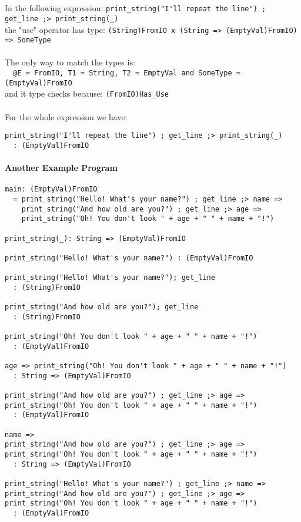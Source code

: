 \documentclass{article}
\begin{document}
\\\\
In the following expression:
\verb|print_string("I'll repeat the line") ; get_line ;> print_string(_)|
\\
the "use" operator has type:
\verb|(String)FromIO x (String => (EmptyVal)FromIO) => SomeType|
\\\\
The only way to match the types is:
\\
\verb|  @E = FromIO, T1 = String, T2 = EmptyVal and SomeType = (EmptyVal)FromIO|
\\
and it type checks because: \verb|(FromIO)Has_Use|
\\\\
For the whole expression we have:
\begin{verbatim}
print_string("I'll repeat the line") ; get_line ;> print_string(_)
  : (EmptyVal)FromIO
\end{verbatim}

\newpage
\paragraph{Another Example Program}
\begin{verbatim}
main: (EmptyVal)FromIO
  = print_string("Hello! What's your name?") ; get_line ;> name =>
    print_string("And how old are you?") ; get_line ;> age =>
    print_string("Oh! You don't look " + age + " " + name + "!")

print_string(_): String => (EmptyVal)FromIO

print_string("Hello! What's your name?") : (EmptyVal)FromIO

print_string("Hello! What's your name?"); get_line
  : (String)FromIO

print_string("And how old are you?"); get_line
  : (String)FromIO

print_string("Oh! You don't look " + age + " " + name + "!")
  : (EmptyVal)FromIO

age => print_string("Oh! You don't look " + age + " " + name + "!")
  : String => (EmptyVal)FromIO

print_string("And how old are you?") ; get_line ;> age =>
print_string("Oh! You don't look " + age + " " + name + "!")
  : (EmptyVal)FromIO

name =>
print_string("And how old are you?") ; get_line ;> age =>
print_string("Oh! You don't look " + age + " " + name + "!")
  : String => (EmptyVal)FromIO

print_string("Hello! What's your name?") ; get_line ;> name =>
print_string("And how old are you?") ; get_line ;> age =>
print_string("Oh! You don't look " + age + " " + name + "!")
  : (EmptyVal)FromIO
\end{verbatim}
\end{document}
